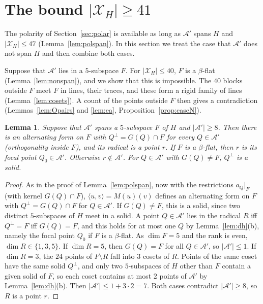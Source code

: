 \documentclass[11pt]{amsart}
\newtheorem{lemma}[theorem]{Lemma}
\theoremstyle{definition}
\newcommand{\X}{\mathcal{X}}
\newcommand{\A}{\mathcal{A}}
\begin{document}
\section{\texorpdfstring{The bound $|\X_H|\ge41$}{The bound |XH| >= 41}}\label{sec:41}

The polarity of Section~\ref{sec:polar} is available as long as $\A'$ spans $H$ and $|\X_H|\le47$ (Lemma~\ref{lem:polspan}). In this section we treat the case that $\A'$ does not span $H$ and then combine both cases.

Suppose that $\A'$ lies in a $5$-subspace $F$. For $|\X_H|\le40$, $F$ is a $\beta$-flat (Lemma~\ref{lem:nonspan}), and we show that this is impossible. The $40$ blocks outside $F$ meet $F$ in lines, their traces, and these form a rigid family of lines (Lemma~\ref{lem:cosets}). A count of the points outside $F$ then gives a contradiction (Lemmas~\ref{lem:Opairs} and \ref{lem:ea}, Proposition~\ref{prop:caseN}).

\begin{lemma}\label{lem:formF}
Suppose that $\A'$ spans a $5$-subspace $F$ of $H$ and $|\A'|\ge8$. Then there is an alternating form on $F$ with $Q^\perp=G(Q)\cap F$ for every $Q\in\A'$ \textup{(}orthogonality inside $F$\textup{)}, and its radical is a point $r$. If $F$ is a $\beta$-flat, then $r$ is its focal point $Q_0\in\A'$. Otherwise $r\notin\A'$. For $Q\in\A'$ with $G(Q)\ne F$, $Q^\perp$ is a solid.
\end{lemma}
\begin{proof}
As in the proof of Lemma~\ref{lem:polspan}, now with the restrictions $a_Q|_F$ (with kernel $G(Q)\cap F$), $\langle u,v\rangle=M(u)(v)$ defines an alternating form on $F$ with $Q^\perp=G(Q)\cap F$ for $Q\in\A'$. If $G(Q)\ne F$, this is a solid, since two distinct $5$-subspaces of $H$ meet in a solid. A point $Q\in\A'$ lies in the radical $R$ iff $Q^\perp=F$ iff $G(Q)=F$, and this holds for at most one $Q$ by Lemma~\ref{lem:dh}(b), namely the focal point $Q_0$ if $F$ is a $\beta$-flat. As $\dim F=5$ and the rank is even, $\dim R\in\{1,3,5\}$. If $\dim R=5$, then $G(Q)=F$ for all $Q\in\A'$, so $|\A'|\le1$. If $\dim R=3$, the $24$ points of $F\setminus R$ fall into $3$ cosets of $R$. Points of the same coset have the same solid $Q^\perp$, and only two $5$-subspaces of $H$ other than $F$ contain a given solid of $F$, so each coset contains at most $2$ points of $\A'$ by Lemma~\ref{lem:dh}(b). Then $|\A'|\le1+3\cdot2=7$. Both cases contradict $|\A'|\ge8$, so $R$ is a point $r$.
\end{proof}
\end{document}
